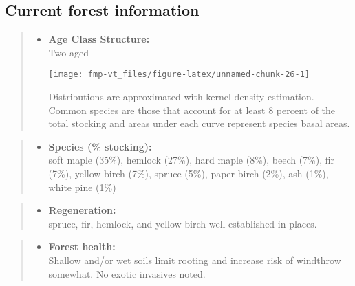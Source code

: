 \documentclass[]{tufte-handout}
\providecommand{\tightlist}{%
  \setlength{\itemsep}{0pt}\setlength{\parskip}{0pt}}
\begin{document}
\subsection{Current forest
information}\label{current-forest-information-6}

\begin{quote}
\begin{itemize}
\tightlist
\item
  \textbf{Age Class Structure:}\\
  \vspace{2pt} Two-aged\\

  \begin{marginfigure}
  \texttt{[image: fmp-vt\_files/figure-latex/unnamed-chunk-26-1]} \caption[Distributions are approximated with kernel density estimation]{Distributions are approximated with kernel density estimation. Common species are those that account for at least 8 percent of the total stocking and areas under each curve represent species basal areas.}\label{fig:unnamed-chunk-26}
  \end{marginfigure}
\end{itemize}
\end{quote}

\begin{quote}
\begin{itemize}
\tightlist
\item
  \textbf{Species (\% stocking):}\\
  \vspace{2pt} soft maple (35\%), hemlock (27\%), hard maple (8\%),
  beech (7\%), fir (7\%), yellow birch (7\%), spruce (5\%), paper birch
  (2\%), ash (1\%), white pine (1\%)
\end{itemize}
\end{quote}

\begin{quote}
\begin{itemize}
\tightlist
\item
  \textbf{Regeneration:}\\
  \vspace{2pt} spruce, fir, hemlock, and yellow birch well established
  in places.
\end{itemize}
\end{quote}

\begin{quote}
\begin{itemize}
\tightlist
\item
  \textbf{Forest health:}\\
  \vspace{2pt} Shallow and/or wet soils limit rooting and increase risk
  of windthrow somewhat. No exotic invasives noted.
\end{itemize}
\end{quote}
\end{document}
